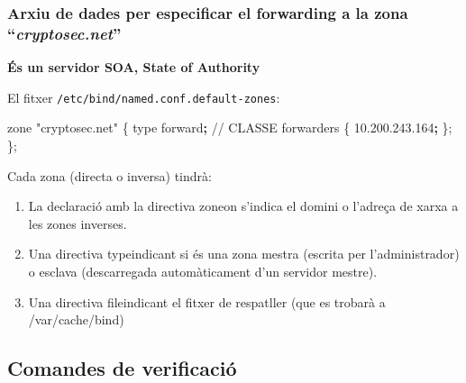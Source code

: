 \documentclass[]{article}
\newenvironment{Shaded}{}{}
\newcommand{\BuiltInTok}[1]{#1}
\newcommand{\ExtensionTok}[1]{#1}
\newcommand{\KeywordTok}[1]{\textcolor[rgb]{0.00,0.44,0.13}{\textbf{#1}}}
\newcommand{\NormalTok}[1]{#1}
\newcommand{\StringTok}[1]{\textcolor[rgb]{0.25,0.44,0.63}{#1}}
\begin{document}
\hypertarget{arxiu-de-dades-per-especificar-el-forwarding-a-la-zona-cryptosec.net}{%
\subsubsection{\texorpdfstring{\textbf{Arxiu de dades per especificar el
forwarding a la zona
``\emph{cryptosec.net}''}}{Arxiu de dades per especificar el forwarding a la zona ``cryptosec.net''}}\label{arxiu-de-dades-per-especificar-el-forwarding-a-la-zona-cryptosec.net}}

\textbf{És un servidor SOA, State of Authority}

El fitxer \texttt{/etc/bind/named.conf.default-zones}:

\begin{Shaded}
\begin{Highlighting}[]
\ExtensionTok{zone} \StringTok{"cryptosec.net"}\NormalTok{ \{}
        \BuiltInTok{type}\NormalTok{ forward}\KeywordTok{;}
\ExtensionTok{//}\NormalTok{ CLASSE}
        \ExtensionTok{forwarders}\NormalTok{ \{ 10.200.243.164}\KeywordTok{;}\NormalTok{ \};}
\NormalTok{\};}
\end{Highlighting}
\end{Shaded}

Cada zona (directa o inversa) tindrà:

\begin{enumerate}
\def\labelenumi{\arabic{enumi}.}
\item
  La declaració amb la directiva zoneon s'indica el domini o l'adreça de
  xarxa a les zones inverses.
\item
  Una directiva typeindicant si és una zona mestra (escrita per
  l'administrador) o esclava (descarregada automàticament d'un servidor
  mestre).
\item
  Una directiva fileindicant el fitxer de respatller (que es trobarà a
  /var/cache/bind)
\end{enumerate}

\hypertarget{comandes-de-verificaciuxf3}{%
\subsection{\texorpdfstring{\textbf{Comandes de
verificació}}{Comandes de verificació}}\label{comandes-de-verificaciuxf3}}
\end{document}
